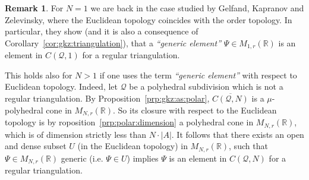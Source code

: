 \documentclass[12pt, a4article]{amsart}   	%
\numberwithin{equation}{section}
\theoremstyle{plain}
\newtheorem{corollary}[theorem]{Corollary}
\theoremstyle{definition}
\newtheorem{remark}[theorem]{Remark}
\newcommand{\R}{{\mathbb R}}
\newcommand{\bfSigma}{{\bf \Sigma}}
\newcommand{\mcQ}{{\mathcal Q}}
\newcommand{\MNaR}{M_{N,r}(\R)}
\begin{document}
\begin{remark}\label{remark:generic:matrix}\rm
For $N=1$ we are back in the case studied by Gelfand, Kapranov and Zelevinsky, where the Euclidean topology coincides with the order topology. In particular, they show (and it is also a consequence of Corollary~\ref{cor:gkz:triangulation}), that a \emph{``generic element''} $\Psi\in M_{1,r}(\mathbb R)$ is an element in $C(\mcQ,1)$ for a regular triangulation.

This holds also for $N>1$ if one uses the term \emph{``generic element''} with respect to Euclidean topology.
Indeed, let $\mcQ$ be a polyhedral subdivision which is not a regular triangulation. By Proposition~\ref{prp:gkz:as:polar}, $\overline{C(\mcQ,N)}$ is a $\mu$-polyhedral cone in $M_{N,r}(\mathbb R)$. So its closure with respect to the Euclidean topology is by roposition~\ref{prp:polar:dimension} a polyhedral cone in  $M_{N,r}(\mathbb R)$, which is of dimension strictly less than $N\cdot |A|$. It follows that there exists an open and dense subset $U$ (in the Euclidean topology) in $M_{N,r}(\mathbb R)$, such that $\Psi\in M_{N,r}(\mathbb R)$ generic (i.e. $\Psi\in U$) implies $\Psi$ is an element in $C(\mcQ,N)$ for a regular triangulation.
\end{remark}




\end{document}
